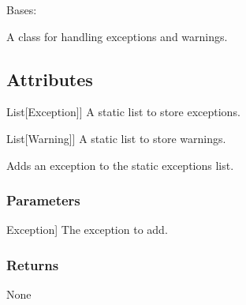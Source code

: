 \documentclass[letterpaper,10pt,english]{sphinxmanual}
\begin{document}
\begin{fulllineitems}
\label{\detokenize{exception:exception.My_Exception}}
\pysigstartsignatures
{}
\pysigstopsignatures
\sphinxAtStartPar
Bases: 

\sphinxAtStartPar
A class for handling exceptions and warnings.


\subsection{Attributes}
\label{\detokenize{exception:attributes}}\begin{description}
\sphinxlineitem{exceptions\_list}{[}List{[}Exception{]}{]}
\sphinxAtStartPar
A static list to store exceptions.

\sphinxlineitem{warnings\_list}{[}List{[}Warning{]}{]}
\sphinxAtStartPar
A static list to store warnings.

\end{description}

\begin{fulllineitems}
\label{\detokenize{exception:exception.My_Exception.add_exception}}
\pysigstartsignatures
{}
\pysigstopsignatures
\sphinxAtStartPar
Adds an exception to the static exceptions list.


\subsubsection{Parameters}
\label{\detokenize{exception:parameters}}\begin{description}
\sphinxlineitem{e}{[}Exception{]}
\sphinxAtStartPar
The exception to add.

\end{description}


\subsubsection{Returns}
\label{\detokenize{exception:returns}}
\sphinxAtStartPar
None


\end{fulllineitems}
\end{fulllineitems}
\end{document}
